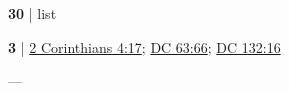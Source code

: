 	\begin{compactdesc}
	
		\item[glory of God] \textbf{30} | list
			
		\item[weight of glory] \textbf{3} | \hyperref[2CORINTHIANS-4-17]{2 Corinthians 4:17}; \hyperref[DC63-66]{DC 63:66}; \hyperref[DC132-16]{DC 132:16}
			\begin{compactdesc}
				\item[Bible anchor verses] \phantom{.}
					\begin{compactdesc}
						\item[{\hyperref[2CORINTHIANS-4-17]{2 Corinthians 4:17}}] 
					\end{compactdesc}
				\item[Commentary] ---
			\end{compactdesc}
			
			
	\end{compactdesc}
	

